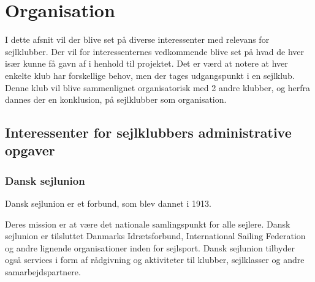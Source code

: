 \chapter{Organisation}\label{chap:organisation}


I dette afsnit vil der blive set på diverse interessenter med relevans for sejlklubber. Der vil for interessenternes
vedkommende blive set på hvad de hver især kunne få gavn af i henhold til projektet. Det er værd at notere at hver
enkelte klub har forskellige behov, men der tages udgangspunkt i en sejlklub. Denne klub vil blive sammenlignet organisatorisk med 2 andre klubber, og herfra dannes der en konklusion, på sejlklubber som organisation.

\section{Interessenter for sejlklubbers administrative opgaver}

\subsection{Dansk sejlunion}

Dansk sejlunion er et forbund, som blev dannet i 1913.

Deres mission er at være det nationale samlingspunkt for alle sejlere. Dansk sejlunion er tilsluttet Danmarks
Idrætsforbund, International Sailing Federation og andre lignende organisationer inden for sejlsport. Dansk
sejlunion tilbyder også services i form af rådgivning og aktiviteter til klubber, sejlklasser og andre
samarbejdspartnere.


%


